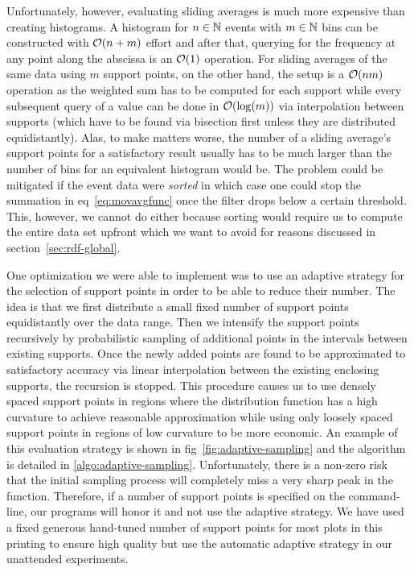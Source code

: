 \documentclass{graphstudy}
\begin{document}
Unfortunately, however, evaluating sliding averages is much more expensive than creating histograms.  A histogram for
\(n\in\mathbb{N}\) events with \(m\in\mathbb{N}\) bins can be constructed with \(\operatorname{\mathcal{O}}(n+m)\) effort and after that, querying
for the frequency at any point along the abscissa is an \(\operatorname{\mathcal{O}}(1)\) operation.  For sliding averages of the same data
using \(m\) support points, on the other hand, the setup is a \(\operatorname{\mathcal{O}}(nm)\) operation as the weighted sum has to be
computed for each support while every subsequent query of a value can be done in \(\operatorname{\mathcal{O}}(\log(m))\) via interpolation
between supports (which have to be found via bisection first unless they are distributed equidistantly).  Alas, to make
matters worse, the number of a sliding average's support points for a satisfactory result usually has to be much larger
than the number of bins for an equivalent histogram would be.  The problem could be mitigated if the event data were
\emph{sorted} in which case one could stop the summation in \acl{eq}~\ref{eq:movavgfunc} once the filter drops below a
certain threshold.  This, however, we cannot do either because sorting would require us to compute the entire data set
upfront which we want to avoid for reasons discussed in \acl{section}~\ref{sec:rdf-global}.

One optimization we were able to implement was to use an adaptive strategy for the selection of support points in order
to be able to reduce their number.  The idea is that we first distribute a small fixed number of support points
equidistantly over the data range.  Then we intensify the support points recursively by probabilistic sampling of
additional points in the intervals between existing supports.  Once the newly added points are found to be approximated
to satisfactory accuracy via linear interpolation between the existing enclosing supports, the recursion is stopped.
This procedure causes us to use densely spaced support points in regions where the distribution function has a high
curvature to achieve reasonable approximation while using only loosely spaced support points in regions of low curvature
to be more economic.  An example of this evaluation strategy is shown in \acl{fig}~\ref{fig:adaptive-sampling} and the
algorithm is detailed in \ref{algo:adaptive-sampling}.  Unfortunately, there is a non-zero risk that the initial
sampling process will completely miss a very sharp peak in the function.  Therefore, if a number of support points is
specified on the command-line, our programs will honor it and not use the adaptive strategy.  We have used a fixed
generous hand-tuned number of support points for most plots in this printing to ensure high quality but use the
automatic adaptive strategy in our unattended experiments.
\end{document}

